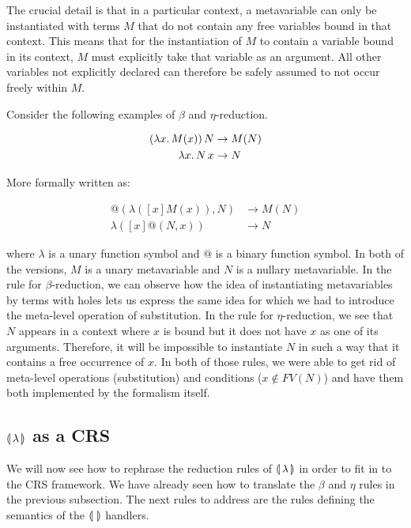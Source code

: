 The crucial detail is that in a particular context, a metavariable can only
be instantiated with terms $M$ that do not contain any free variables bound
in that context. This means that for the instantiation of $M$ to contain a
variable bound in its context, $M$ must explicitly take that variable as an
argument. All other variables not explicitly declared can therefore be
safely assumed to not occur freely within $M$.

Consider the following examples of $\beta$ and $\eta$-reduction.

\begin{align*}
  (\lambda x.\, M(x))\,N & \to M(N) \\
  \lambda x.\, N\,x & \to N
\end{align*}

More formally written as:

\begin{align*}
  @(\lambda([x]M(x)),N) & \to M(N) \\
  \lambda([x]@(N,x)) & \to N
\end{align*}

where $\lambda$ is a unary function symbol and $@$ is a binary function
symbol. In both of the versions, $M$ is a unary metavariable and $N$ is a
nullary metavariable. In the rule for $\beta$-reduction, we can observe how
the idea of instantiating metavariables by terms with holes lets us express
the same idea for which we had to introduce the meta-level operation of
substitution. In the rule for $\eta$-reduction, we see that $N$ appears in
a context where $x$ is bound but it does not have $x$ as one of its
arguments. Therefore, it will be impossible to instantiate $N$ in such a
way that it contains a free occurrence of $x$. In both of those rules, we
were able to get rid of meta-level operations (substitution) and conditions
($x \notin FV(N)$) and have them both implemented by the formalism itself.


\subsection{\texorpdfstring{$\llparenthesis \, \lambda \, \rrparenthesis$}{Our Calculus} as a CRS}
\label{ssec:banana-as-crs}

We will now see how to rephrase the reduction rules of $\llparenthesis \, \lambda \, \rrparenthesis$ in
order to fit in to the CRS framework. We have already seen how to translate
the $\beta$ and $\eta$ rules in the previous subsection. The next
rules to address are the rules defining the semantics of the $\llparenthesis \,  \, \rrparenthesis$
handlers.

